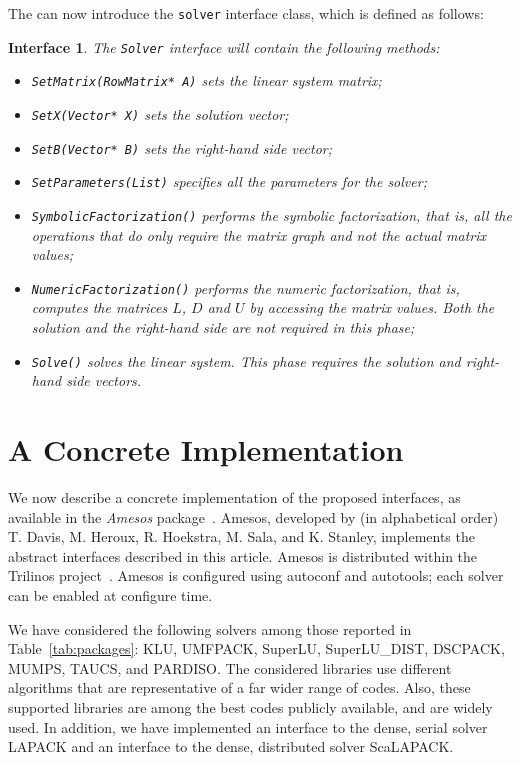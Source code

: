 \documentclass[acmtocl]{acmtrans2m}
\newtheorem{interface}{Interface}[section]
\begin{document}
The can now introduce the {\tt solver} interface class, which is defined as
follows:
\begin{interface}
\label{int:asi}
The {\tt Solver} interface
will contain the following methods:
\begin{itemize}
\item \verb!SetMatrix(RowMatrix* A)! sets the linear system matrix;
\item \verb!SetX(Vector* X)! sets the solution vector;
\item \verb!SetB(Vector* B)! sets the right-hand side vector;
\item \verb!SetParameters(List)! specifies all the parameters for the solver;
\item \verb!SymbolicFactorization()! performs the symbolic factorization, that
is, all the operations that do only require the matrix graph and not the
actual matrix values;
\item \verb!NumericFactorization()! performs the numeric factorization, that
is, computes the matrices $L$, $D$ and $U$ by accessing the matrix values.
Both the solution and the right-hand side are not required in this phase;
\item \verb!Solve()! solves the linear system. This phase requires the
solution and right-hand side vectors.
\end{itemize}
\end{interface}

\section{A Concrete Implementation}
\label{sec:concrete}

We now describe a concrete implementation of the proposed interfaces, as
available in the {\sl Amesos} package~\cite{Amesos-Reference-Guide}. 
Amesos,
developed by (in alphabetical order) T. Davis, M. Heroux, R. Hoekstra, M.
Sala, and K. Stanley, implements the abstract interfaces described in this
article. Amesos is distributed within the
Trilinos project~\cite{heroux05trilinos,trilinos-home-page}. Amesos is
configured using autoconf and autotools; each solver can be enabled at
configure time.

We have considered the following solvers among those
reported in Table~\ref{tab:packages}: KLU, UMFPACK, SuperLU, SuperLU\_DIST,
  DSCPACK, MUMPS, TAUCS, and PARDISO.
The considered libraries use different algorithms that are
representative of a far wider range of codes. Also, these supported libraries are
among the best codes publicly available, and are widely used.  In addition, we
have implemented an interface to the dense, serial solver LAPACK and an
interface to the dense, distributed solver ScaLAPACK.
\end{document}
